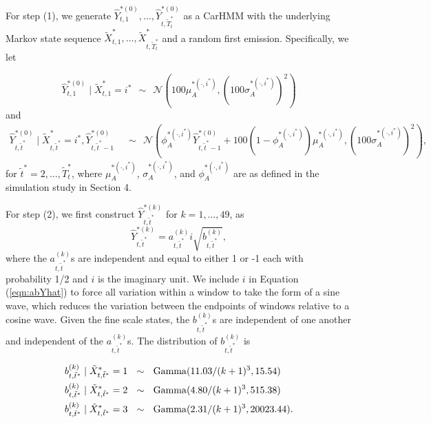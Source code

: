 For step (1), we generate $\hat Y^{*(0)}_{t,1}, \ldots, \hat Y^{*(0)}_{t,\tilde T_t^*}$ as a CarHMM with the underlying Markov state sequence $\tilde X^{*}_{t,1}, \ldots, \tilde X^{*}_{t,\tilde T_t^*}$ and a random first emission. Specifically, we let

\[
	\hat{Y}^{*(0)}_{t,1} \mid \tilde X^*_{t,1} = i^* ~~\sim~~ \mathcal{N} \left(100 \mu^{*(\cdot,i^*)}_A, \left(100\sigma_A^{*(\cdot,i^*)}\right)^2 \right)
\]
and
\begin{align}	
   \hat{Y}^{*(0)}_{t,\tilde t^*}\mid\tilde X^*_{t,\tilde t^*} = i^*,\hat{Y}^{*(0)}_{t,\tilde t^*-1}
   &~~\sim ~~\mathcal{N} \left(\phi_A^{*(\cdot,i^*)} \hat{Y}^{*(0)}_{t,\tilde t^*-1} + 100(1-\phi_A^{*(\cdot,i^*)}) \mu^{*(\cdot,i^*)}_A, \left(100\sigma_A^{*(\cdot,i^*)}\right)^2 \right), \label{eqn:yhat_0}
\end{align}
for $\tilde t^* = 2,\ldots, \tilde T^*_t$, where $\mu_A^{*(\cdot,i^*)}$, $\sigma_A^{*(\cdot,i^*)}$, and $\phi_A^{*(\cdot,i^*)}$ are as defined in the simulation study in Section 4.
  
For step (2), we first construct $\hat{Y}^{*(k)}_{t,\tilde t^*}$ for $k=1,\ldots, 49$, as
%
\begin{equation}
    \hat{Y}^{*(k)}_{t,\tilde t^*} = a_{t,\tilde t^*}^{(k)} i\sqrt{b^{(k)}_{t,\tilde t^*}},
    \label{eqn:abYhat}
\end{equation}
%
where the $a^{(k)}_{t,\tilde t^*}$s are independent and equal to either 1 or -1 each with probability 1/2 and $i$ is the imaginary unit. We include $i$ in Equation (\ref{eqn:abYhat}) to force all variation within a window to take the form of a sine wave, which reduces the variation between the endpoints of windows relative to a cosine wave. Given the fine scale states, the $b^{(k)}_{t,\tilde t^*}$s are independent of one another and independent of the $a^{(k)}_{t,\tilde t^*}$s.  
The distribution of $b^{(k)}_{t,\tilde t^*}$ is
   
\begin{align}
\begin{split}
	b^{(k)}_{t,\tilde t^*} \mid \tilde X^*_{t,\tilde t^*} = 1 &~~\sim~~ {\rm{Gamma}}(11.03/(k+1)^3, 15.54) \\
	b^{(k)}_{t,\tilde t^*} \mid \tilde X^*_{t,\tilde t^*} = 2  &~~\sim ~~{\rm{Gamma}}(4.80/(k+1)^3, 515.38) \\ 
	b^{(k)}_{t,\tilde t^*} \mid \tilde X^*_{t,\tilde t^*} = 3  &~~\sim ~~{\rm{Gamma}}(2.31/(k+1)^3, 20023.44). 
\end{split}
\label{eqn:bdist}
\end{align}


